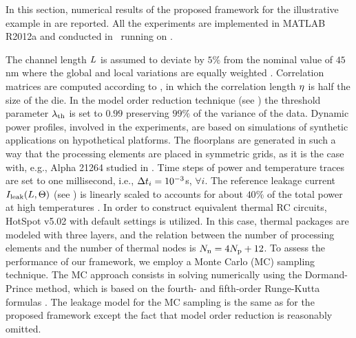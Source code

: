 In this section, numerical results of the proposed framework for the illustrative example in  are reported. All the experiments are implemented in MATLAB R2012a \cite{matlab} and conducted in \hostOS\ running on \hostHardware.

The channel length $L$ is assumed to deviate by $5\%$ from the nominal value of $45$ nm where the global and local variations are equally weighted \cite{juan2011, juan2012}. Correlation matrices are computed according to , in which the correlation length $\eta$ is half the size of the die. In the model order reduction technique (see ) the threshold parameter $\lambda_\text{th}$ is set to $0.99$ preserving $99\%$ of the variance of the data. Dynamic power profiles, involved in the experiments, are based on simulations of synthetic applications on hypothetical platforms. The floorplans are generated in such a way that the processing elements are placed in symmetric grids, as it is the case with, e.g., Alpha 21264 studied in \cite{juan2011}. Time steps of power and temperature traces are set to one millisecond, i.e., $\Delta t_i = 10^{-3}$s, $\forall i$. The reference leakage current $I_{\text{leak}}(L, \Theta)$ (see ) is linearly scaled to accounts for about $40\%$ of the total power at high temperatures \cite{liu2007}. In order to construct equivalent thermal RC circuits, HotSpot v5.02 \cite{hotspot} with default settings is utilized. In this case, thermal packages are modeled with three layers, and the relation between the number of processing elements and the number of thermal nodes is $N_\text{n} = 4 {N_\text{p}} + 12$. To assess the performance of our framework, we employ a Monte Carlo (MC) sampling technique. The MC approach consists in solving  numerically using the Dormand-Prince method, which is based on the fourth- and fifth-order Runge-Kutta formulas \cite{press2007}. The leakage model for the MC sampling is the same as for the proposed framework except the fact that model order reduction is reasonably omitted.

